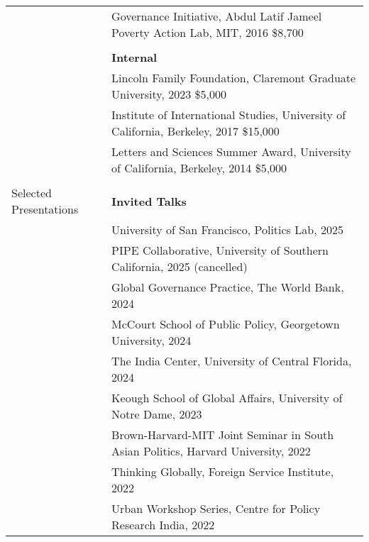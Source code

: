 \documentclass[letterpaper, 10.5pt]{article}
\begin{document}
\begin{longtable}{p{1.5in}p{5in}}
&Governance Initiative, Abdul Latif Jameel Poverty Action Lab, MIT, 2016 \hfill \$8,700 \\

& \\

& \textbf{Internal}\\

& Lincoln Family Foundation, Claremont Graduate University, 2023 \hfill \$5,000\\


&Institute of International Studies, University of California, Berkeley, 2017 \hfill \$15,000  \\
& Letters and Sciences Summer Award, University of California, Berkeley, 2014 \hfill \$5,000\\
& \\





{{Selected Presentations}} & \textbf{Invited Talks}\\
& University of San Francisco, Politics Lab, 2025\\
& PIPE Collaborative, University of Southern California, 2025 (cancelled)\\
&Global Governance Practice, The World Bank,  2024\\

&McCourt School of Public Policy, Georgetown University, 2024\\
& The India Center, University of Central Florida, 2024\\
&Keough School of Global Affairs, University of Notre Dame, 2023\\
 &Brown-Harvard-MIT Joint Seminar in South Asian Politics, Harvard University, 2022\\
  &Thinking Globally, Foreign Service Institute, 2022 \\
 &Urban Workshop Series, Centre for Policy Research India, 2022\\


\end{longtable}
\end{document}
